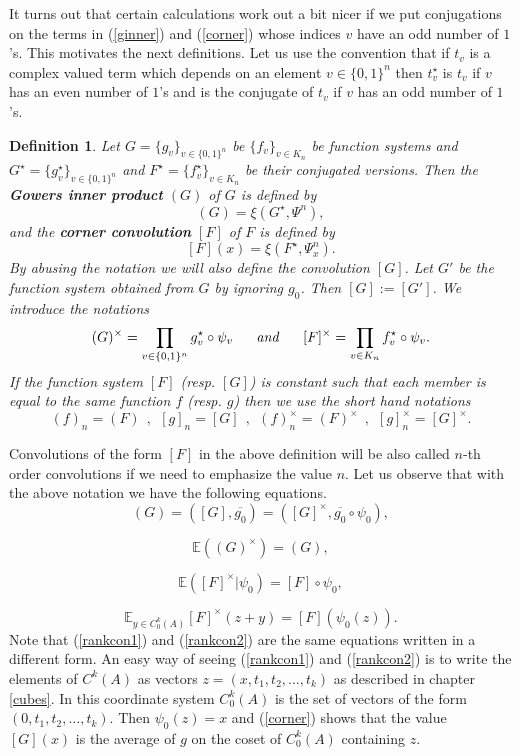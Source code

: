 \documentclass [11pt] {article}
\newtheorem{definition}{Definition}[section]
\def\con{\star}
\begin{document}
It turns out that certain calculations work out a bit nicer if we put conjugations on the terms in (\ref{ginner}) and (\ref{corner}) whose indices $v$ have an odd number of $1$'s. This motivates the next definitions.
Let us use the convention that if $t_v$ is a complex valued term which depends on an element $v\in\{0,1\}^n$ then $t_v^\con$ is $t_v$ if $v$ has an even number of $1$'s and is the conjugate of $t_v$ if $v$ has an odd number of $1$'s.

\begin{definition} Let $G=\{g_v\}_{v\in\{0,1\}^n}$ be $\{f_v\}_{v\in K_n}$ be function systems and $G^\con=\{g_v^\con\}_{v\in\{0,1\}^n}$ and $F^\con=\{f_v^\con\}_{v\in K_n}$ be their conjugated versions.
Then the {\bf Gowers inner product} $(G)$ of $G$ is defined by
$$(G)=\xi(G^\con,\Psi^n),$$
and the {\bf corner convolution} $[F]$ of $F$ is defined by
$$[F](x)=\xi(F^\con,\Psi^n_x).$$
By abusing the notation we will also define the convolution $[G]$. Let $G'$ be the function system obtained from $G$ by ignoring $g_0$. Then $[G]:=[G']$. We introduce the notations $$(G)^\times=\prod_{v\in\{0,1\}^n}g_v^\con\circ\psi_v~~~~~{\it and}~~~~~[F]^\times=\prod_{v\in K_n}f_v^\con\circ\psi_v.$$
If the function system $[F]$ (resp. $[G]$) is constant such that each member is equal to the same function $f$ (resp. $g$) then we use the short hand notations $$(f)_n=(F)~~,~~[g]_n=[G]~~,~~(f)_n^\times=(F)^\times~~,~~[g]_n^\times=[G]^\times.$$

\end{definition}

Convolutions of the form $[F]$ in the above definition will be also called $n$-th order convolutions if we need to emphasize the value $n$. 
Let us observe that with the above notation we have the following equations.
\begin{equation}\label{coincon}
(G)=([G],\overline{g_0})=([G]^\times,\overline{g_0}\circ\psi_0),
\end{equation}

$$\mathbb{E}((G)^\times)=(G),$$

\begin{equation}\label{rankcon1}
\mathbb{E}([F]^\times|\psi_0)=[F]\circ\psi_0,
\end{equation}

\begin{equation}\label{rankcon2}
\mathbb{E}_{y\in C^k_0(A)}[F]^\times(z+y)=[F](\psi_0(z)).
\end{equation}
Note that (\ref{rankcon1}) and (\ref{rankcon2}) are the same equations written in a different form.
An easy way of seeing (\ref{rankcon1}) and (\ref{rankcon2}) is to write the elements of $C^k(A)$ as vectors $z=(x,t_1,t_2,\dots,t_k)$ as described in chapter \ref{cubes}. In this coordinate system $C^k_0(A)$ is the set of vectors of the form $(0,t_1,t_2,\dots,t_k)$. Then $\psi_0(z)=x$ and (\ref{corner}) shows that the value $[G](x)$ is the average of $g$ on the coset of $C^k_0(A)$ containing $z$.
\end{document}
